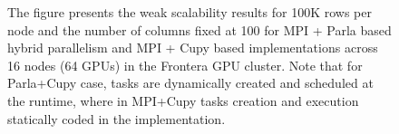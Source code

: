 \documentclass{article}
\begin{document}
\begin{figure}[H]
    \caption{The figure presents the weak scalability results for 100K rows per node and the number of columns fixed at 100 for MPI + Parla based hybrid parallelism and MPI + Cupy based implementations across 16 nodes (64 GPUs) in the Frontera GPU cluster. Note that for Parla+Cupy case, tasks are dynamically created and scheduled at the runtime, where in MPI+Cupy tasks creation and execution statically coded in the implementation.  \label{fig:parla_ws_n100}  }
\end{figure}
\end{document}
